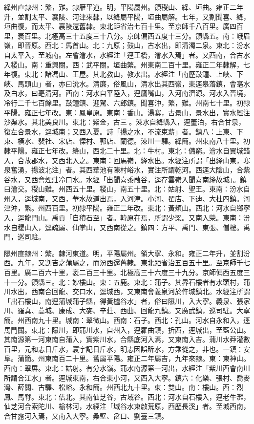\begin{pinyinscope}
絳州直隸州：繁，難。隸雁平道。明，平陽屬州。領稷山、絳、垣曲。雍正二年升，並割太平、襄陵、河津來隸，以絳屬平陽，垣曲屬解。七年，又割聞喜、絳，垣曲復，而太平、襄陵還舊隸。東北距省治七百十里。至京師千八百里。廣四百里，袤百里。北極高三十五度三十八分。京師偏西五度十三分。領縣五。南：峨眉嶺，即晉原。西北：馬首山。北：九原；鼓山，古水出，即清濁二泉。東北：汾水自太平入，至城南。左會澮水，水經注「逕王橋，澮水入焉」者。又西南，合古水入稷山。南：重興關。西：武平關。垣曲繁。州東南二百十里。雍正二年隸解，七年復。東北：諸馮山、王屋。其北教山，教水出。水經注「南歷鼓鐘、上峽、下峽、馬頭山」者，亦曰沇水。清廉，俗風山，清水出其西嶺，東逕皋落鎮，會亳水及白水，曰亳清河。西南：河水自平陸入，逕鷹嘴山，入河南濟源。河水入晉境，冷行二千七百餘里。鼓鐘鎮、迎駕、六郎鎮。聞喜沖，繁，難。州南七十里。初隸平陽。雍正七年改。東：鳳皇原。東南：香山。湯寨，古景山，景水出，實水經注沙渠水。其北美良川。東北：紫金，古三。涑水自絳縣入，逕董泊，右合甘泉，復左合景水，逕城南；又西入夏。詩「揚之水，不流束薪」者。鎮八：上東、下東、橫水、裴社、宋店、慄村、郭店、蘭德。涑川一驛。絳簡。州東南八十里。初隸平陽。雍正七年改。絳山，西北二十里。北：牛村。東北：備窮。澮水自翼城錯入，合故郡水，又西北入之。東南：回馬嶺，絳水出。水經注所謂「出絳山東，寒泉奮湧，揚波北注」者。其西華池有陳村峪水，實注所謂乾河。西逕大陰山，合紫谷水，又西會煙莊冷口水。水經「出聞喜黍葭谷，逕存雲嶺入聞喜南絳故城」。鎮曰澮交。稷山難。州西五十里。稷山，南五十里。北：姑射、聖王。東南：汾水自州入，逕城南，又西，華水故道出焉，入河津。小河、翟店、下迪、大杜四鎮。河津沖，繁。州西百里。初隸平陽。雍正二年改。東北：黃頰山。西北：河水自鄉寧入，逕龍門山。禹貢「自積石至」者。韓原在焉，所謂少梁。又南入榮。東南：汾水自稷山入，逕疏屬、仙掌山，又西南從之。鎮四：方平、禹門、東張、僧樓。禹門，巡司駐。

隰州直隸州：繁。隸河東道。明，平陽屬州。領大寧、永和。雍正二年升，並割汾西。九年，又割吉之蒲屬之，而汾西還舊隸。東北距省治五百五十里。至京師千七百里。廣二百六十里，袤二百三十里。北極高三十六度三十九分。京師偏西五度三十一分。領縣三。北：妙樓山。東：五鹿。東北：蒲子。其界石樓者有水頭村，蒲川水出，西南合回龍、交口水，逕城西，又東南會義泉河於仵城鎮北。水經注所謂「出石樓山，南逕蒲城蒲子縣，得黃櫨谷水」者，俗曰隰川，入大寧。義泉、張家川、羅真、蒿城、康成、大麥、辛莊、西曲、回龍九鎮。又廣武鎮，巡司駐。大寧簡。州西南九十里。城南：翠微山。西南：石子。西北：孔山。河水自永和入，逕馬鬥關。東北：隰川，即蒲川水，自州入，逕羅曲鎮，折西，逕城出，至藍公山。其南源第一河東南自蒲入，實紫川水，合縣底河入焉，又東南入吉。蒲川水莽灌數百里，元和志日斤水，寰宇記日斤水，明志因誤昕水，方乘從之，非也。一鎮：安阜。蒲簡。州東南百二十里。舊屬平陽。雍正二年屬吉，九年來隸。東：東神山。西南：翠屏。東北：姑射。有分水嶺。蒲水南源第一河出，水經注「紫川西會南川所謂合江水」者。逕城東南，右合東小河，又西入大寧。鎮六：化樂、張村、喬麥灣、薛關、古驛、松峪。永和簡。州西北九十里。東：雙山。南：樓山。西：烈鳳、馬脊。東北：佶北。其南仙芝谷，古域谷。西北：河水自石樓入，逕老牛灘，仙芝河合索陀川、榆林河，水經注「域谷水東啟荒原，西歷長溪」者。至城西南，合甘露河入焉，又南入大寧。桑壁、岔口、劉臺三鎮。


\end{pinyinscope}
